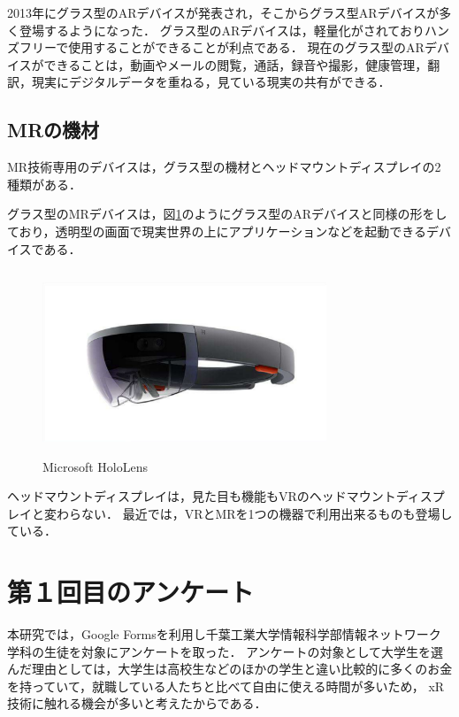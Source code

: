 \documentclass[12pt,a4j]{ltjsarticle}
\begin{document}
2013年にグラス型のARデバイスが発表され，そこからグラス型ARデバイスが多く登場するようになった．
グラス型のARデバイスは，軽量化がされておりハンズフリーで使用することができることが利点である．
現在のグラス型のARデバイスができることは，動画やメールの閲覧，通話，録音や撮影，健康管理，翻訳，現実にデジタルデータを重ねる，見ている現実の共有ができる\cite{グラス型ARデバイス}．

\subsection{MRの機材}
MR技術専用のデバイスは，グラス型の機材とヘッドマウントディスプレイの2種類がある．

グラス型のMRデバイスは，図\ref{fig:Microsoft_HoloLens.pdf}のようにグラス型のARデバイスと同様の形をしており，透明型の画面で現実世界の上にアプリケーションなどを起動できるデバイスである．

\begin{figure}[h]
\begin{center}
 \includegraphics[clip,width=85mm,height=55mm]{Microsoft_HoloLens.pdf}
\end{center}
 \caption{Microsoft HoloLens}
 \label{fig:Microsoft_HoloLens.pdf}
\end{figure}

ヘッドマウントディスプレイは，見た目も機能もVRのヘッドマウントディスプレイと変わらない．
最近では，VRとMRを1つの機器で利用出来るものも登場している．
\clearpage

\section{第１回目のアンケート}
本研究では，Google Formsを利用し千葉工業大学情報科学部情報ネットワーク学科の生徒を対象にアンケートを取った．
アンケートの対象として大学生を選んだ理由としては，大学生は高校生などのほかの学生と違い比較的に多くのお金を持っていて，就職している人たちと比べて自由に使える時間が多いため， xR技術に触れる機会が多いと考えたからである．
\end{document}
